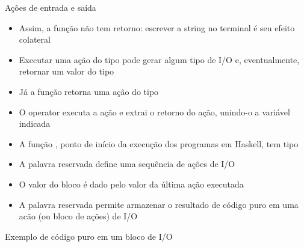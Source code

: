 \begin{frame}[fragile]{Ações de entrada e saída}

    \begin{itemize}
        \item Assim, a função  não tem retorno: escrever a string no
            terminal é seu efeito colateral

        \item Executar uma ação do tipo   pode gerar algum tipo
            de I/O e, eventualmente, retornar um valor do tipo 

        \item Já a função  retorna uma ação do tipo 

        \item O operator  executa a ação e extrai o retorno do ação, unindo-o
            a variável indicada

        \item A função , ponto de início da execução dos programas em
            Haskell, tem tipo 

        \item A palavra reservada  define uma sequência de ações de I/O

        \item O valor do bloco  é dado pelo valor da última ação executada

        \item A palavra reservada  permite armazenar o resultado de código
            puro em uma acão (ou bloco de ações) de I/O
    \end{itemize}

\end{frame}

\begin{frame}[fragile]{Exemplo de código puro em um bloco de I/O}
\end{frame}

